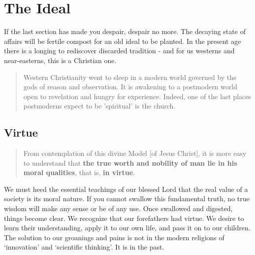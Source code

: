 \documentclass[letterpaper]{article}
\begin{document}

\section{The Ideal}

If the last section has made you despair, despair no more. The decaying state of affairs will be fertile compost for an old ideal to be planted. In the present age there is a longing to rediscover discarded tradition - and for us westerns and near-easterns, this is a Christian one.

\begin{quote}
  Western Christianity went to sleep in a modern world governed by the gods of reason and observation. It is awakening to a postmodern world open to revelation and hungry for experience. Indeed, one of the last places postmoderns expect to be 'spiritual' is the church.
\end{quote}

\subsection{Virtue}

\begin{quote}
  From contemplation of this divine Model [of Jesus Christ], it is more easy to understand that \textbf{the true worth and nobility of man lie in his moral qualities}, that is, \textbf{in virtue}.
\end{quote}

We must heed the essential teachings of our blessed Lord that the real value of a society is its moral nature. If you cannot swallow this fundamental truth, no true wisdom will make any sense or be of any use. Once swallowed and digested, things become clear. We recognize that our forefathers had virtue. We desire to learn their understanding, apply it to our own life, and pass it on to our children. The solution to our groanings and pains is not in the modern religions of `innovation' and `scientific thinking'. It is in the past.
\end{document}
